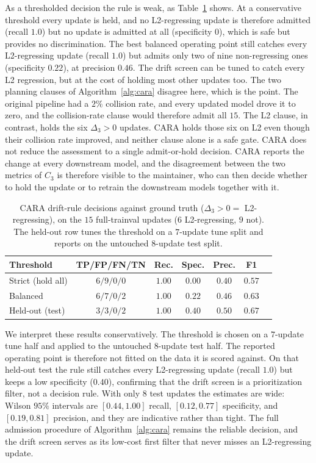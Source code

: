 \documentclass[conference]{IEEEtran}
\begin{document}
As a thresholded decision the rule is weak, as Table~\ref{tab:admission}
shows. At a conservative threshold every update is held, and no L2-regressing update is therefore
admitted (recall $1.0$) but no update is admitted at all (specificity $0$), which
is safe but provides no discrimination. The best balanced operating point still
catches every L2-regressing update (recall $1.0$) but admits only two of nine
non-regressing ones (specificity $0.22$), at precision $0.46$. The drift screen can
be tuned to catch every L2 regression, but at the cost of holding most other
updates too. The two planning clauses of Algorithm~\ref{alg:cara} disagree here,
which is the point. The original pipeline had a $2\%$ collision rate, and every
updated model drove it to zero, and the collision-rate clause would therefore admit all
$15$. The L2 clause, in contrast, holds the six $\Delta_3>0$ updates.
CARA holds those six on L2 even though their collision rate improved, and neither
clause alone is a safe gate. CARA does not reduce the assessment to a single
admit-or-hold decision. CARA reports the change at every downstream model, and the
disagreement between the two metrics of $C_3$ is therefore visible to the
maintainer, who can then decide whether to hold the update or to retrain the
downstream models together with it.

\begin{table}[htbp]
\caption{CARA drift-rule decisions against ground truth ($\Delta_3 > 0 =$
L2-regressing), on the $15$ full-trainval updates ($6$ L2-regressing, $9$ not).
The held-out row tunes the threshold on a $7$-update tune split and reports on
the untouched $8$-update test split.}
\label{tab:admission}
\centering
\renewcommand{\arraystretch}{1.2}
\setlength{\tabcolsep}{5pt}
\begin{tabular}{@{}lcccccc@{}}
\toprule
\textbf{Threshold} & \textbf{TP/FP/FN/TN} & \textbf{Rec.} & \textbf{Spec.} & \textbf{Prec.} & \textbf{F1} \\
\midrule
Strict (hold all)      & $6/9/0/0$ & $1.00$ & $0.00$ & $0.40$ & $0.57$ \\
Balanced              & $6/7/0/2$ & $1.00$ & $0.22$ & $0.46$ & $0.63$ \\
Held-out (test)        & $3/3/0/2$ & $1.00$ & $0.40$ & $0.50$ & $0.67$ \\
\bottomrule
\end{tabular}
\end{table}

We interpret these results conservatively. The threshold is chosen on a $7$-update
tune half and applied to the untouched $8$-update test half. The reported
operating point is therefore not fitted on the data it is scored against. On that held-out test the rule still catches every
L2-regressing update (recall $1.0$) but keeps a low specificity ($0.40$),
confirming that the drift screen is a prioritization filter, not a decision
rule. With only $8$ test updates the estimates are wide: Wilson $95\%$ intervals
are $[0.44, 1.00]$ recall, $[0.12, 0.77]$ specificity, and $[0.19, 0.81]$
precision, and they are indicative rather than tight. The full admission procedure of
Algorithm~\ref{alg:cara} remains the reliable decision, and the drift screen serves
as its low-cost first filter that never misses an L2-regressing update.
\end{document}
